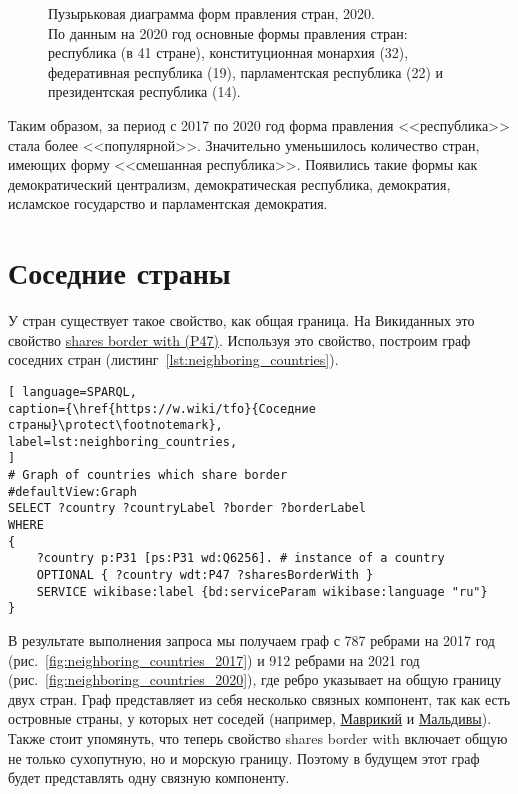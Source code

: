 \begin{figure}
	{
		\setlength{\fboxsep}{0pt}%
		\setlength{\fboxrule}{1pt}%
	}
	\caption{Пузырьковая диаграмма форм правления стран, 2020.
	\\
	По данным на 2020 год  основные формы правления стран: республика (в 41 стране), конституционная монархия (32), федеративная республика (19), парламентская республика (22) и президентская республика (14).
}%
	\label{fig:bubble_chart_forms_of_government_countries_2020}%
\end{figure}

Таким образом, за период с 2017 по 2020 год форма правления <<республика>> стала более <<популярной>>. Значительно уменьшилось количество стран, имеющих форму  <<смешанная республика>>. Появились такие формы как демократический централизм, демократическая республика, демократия, исламское государство и парламентская демократия.

\section{Соседние страны}

У стран существует такое свойство, как общая граница. На Викиданных это свойство  \href{https://www.wikidata.org/wiki/Property:P47}{shares border with (P47)}. Используя это свойство, построим граф соседних стран (листинг~\ref{lst:neighboring_countries}).
\begin{lstlisting}[ language=SPARQL, 
caption={\href{https://w.wiki/tfo}{Соседние страны}\protect\footnotemark},
label=lst:neighboring_countries, 
]
# Graph of countries which share border
#defaultView:Graph
SELECT ?country ?countryLabel ?border ?borderLabel
WHERE
{
	?country p:P31 [ps:P31 wd:Q6256]. # instance of a country
	OPTIONAL { ?country wdt:P47 ?sharesBorderWith }
	SERVICE wikibase:label {bd:serviceParam wikibase:language "ru"}
}
\end{lstlisting}


В результате выполнения запроса мы получаем граф с 787 ребрами на 2017 год (рис.~\ref{fig:neighboring_countries_2017}) и 912 ребрами на 2021 год (рис.~\ref{fig:neighboring_countries_2020}), где ребро указывает на общую границу двух стран. Граф представляет из себя несколько связных компонент, так как есть островные страны, у которых нет соседей (например, \href{https://w.wiki/vC7}{Маврикий} и \href{https://w.wiki/vC8}{Мальдивы}). Также стоит упомянуть, что теперь свойство shares border with включает общую не только сухопутную, но и морскую границу. Поэтому в будущем этот граф будет представлять одну связную компоненту. 

